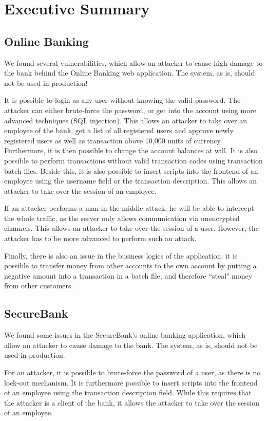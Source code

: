 \chapter{Executive Summary}

\section{Online Banking}
We found several vulnerabilities, which allow an attacker to cause high damage to the bank behind the Online Banking web application. The system, as is, should not be used in production!

It is possible to login as any user without knowing the valid password. The attacker can either brute-force the password, or get into the account using more advanced techniques (SQL injection). This allows an attacker to take over an employee of the bank, get a list of all registered users and approve newly registered users as well as transaction above 10,000 units of currency. Furthermore, it is then possible to change the account balances at will. It is also possible to perform transactions without valid transaction codes using transaction batch files. Beside this, it is also possible to insert scripts into the frontend of an employee using the username field or the transaction description. This allows an attacker to take over the session of an employee.

If an attacker performs a man-in-the-middle attack, he will be able to intercept the whole traffic, as the server only allows communication via unencrypted channels. This allows an attacker to take over the session of a user. However, the attacker has to be more advanced to perform such an attack.

Finally, there is also an issue in the business logics of the application: it is possible to transfer money from other accounts to the own account by putting a negative amount into a transaction in a batch file, and therefore ``steal" money from other customers.

\section{SecureBank}
We found some issues in the SecureBank's online banking application, which allow an attacker to cause damage to the bank. The system, as is, should not be used in production.

For an attacker, it is possible to brute-force the password of a user, as there is no lock-out mechanism. It is furthermore possible to insert scripts into the frontend of an employee using the transaction description field. While this requires that the attacker is a client of the bank, it allows the attacker to take over the session of an employee.

